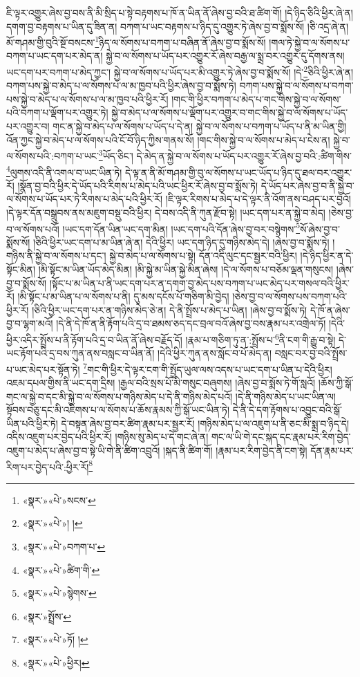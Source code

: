 ཇི་ལྟར་འགྱུར་ཞེས་བྱ་བས་ནི་མི་སྲིད་པ་སྟེ་བརྟགས་པ་ཁོ་ན་ཡིན་ནོ་ཞེས་བྱ་བའི་ཐ་ཚིག་གོ། །དེ་ཉིད་ཅིའི་ཕྱིར་ཞེ་ན། དགག་བྱ་བརྟགས་པ་ཡིན་དུ་ཟིན་ན། བཀག་པ་ཡང་བརྟགས་པ་ཉིད་དུ་འགྱུར་ཏེ་ཞེས་བྱ་བ་སྨོས་སོ། །ཅི་འདྲ་ཞེ་ན། མོ་གཤམ་གྱི་བུའི་སྔོ་བསངས་\footnote{«སྣར་»«པེ་»སངས་}ཉིད་ལ་སོགས་པ་བཀག་པ་བཞིན་ནོ་ཞེས་བྱ་བ་སྨོས་སོ། །གལ་ཏེ་སྐྱེ་བ་ལ་སོགས་པ་བཀག་པ་ཡང་དག་པར་མེད་ན། སྐྱེ་བ་ལ་སོགས་པ་ཡོད་པར་འགྱུར་རོ་ཞེས་བརྒྱ་ལ་སྨྲ་བར་འགྱུར་དུ་དོགས་ནས། ཡང་དག་པར་བཀག་པ་མེད་ཀྱང་། སྐྱེ་བ་ལ་སོགས་པ་ཡོད་པར་མི་འགྱུར་ཏེ་ཞེས་བྱ་བ་སྨོས་སོ། །དེ་\footnote{«སྣར་»«པེ་»། །}ཅིའི་ཕྱིར་ཞེ་ན། བཀག་པས་སྐྱེ་བ་མེད་པ་ལ་སོགས་པ་ལ་མ་ཁྱབ་པའི་ཕྱིར་ཞེས་བྱ་བ་སྨོས་ཏེ། བཀག་པས་སྐྱེ་བ་ལ་སོགས་པ་བཀག་པས་སྐྱེ་བ་མེད་པ་ལ་སོགས་པ་ལ་མ་ཁྱབ་པའི་ཕྱིར་རོ། །གང་གི་ཕྱིར་བཀག་པ་མེད་པ་གང་གིས་སྐྱེ་བ་ལ་སོགས་པའི་བཀག་པ་ལྡོག་པར་འགྱུར་ཏེ། སྐྱེ་བ་མེད་པ་ལ་སོགས་པ་ལྡོག་པར་འགྱུར་བ་གང་གིས་སྐྱེ་བ་ལ་སོགས་པ་ཡོད་པར་འགྱུར་བ། གང་ན་སྐྱེ་བ་མེད་པ་ལ་སོགས་པ་ཡོད་པ་དེ་ན། སྐྱེ་བ་ལ་སོགས་པ་བཀག་པ་ཡོད་པ་ནི་མ་ཡིན་གྱི། འོན་ཀྱང་སྐྱེ་བ་མེད་པ་ལ་སོགས་པའི་ངོ་བོ་ཉིད་ཀྱིས་གནས་སོ། །གང་གིས་སྐྱེ་བ་ལ་སོགས་པ་མེད་པ་ངེས་ན། སྐྱེ་བ་ལ་སོགས་པའི་:བཀག་པ་ཡང་\footnote{«སྣར་»«པེ་»བཀག་པ་}ཡོད་ཅིང་། དེ་མེད་ན་སྐྱེ་བ་ལ་སོགས་པ་ཡོད་པར་འགྱུར་རོ་ཞེས་བྱ་བའི་:ཚིག་གིས་\footnote{«སྣར་»«པེ་»ཚིག་གི་}ལུགས་འདི་ནི་འགལ་བ་ཡང་ཡིན་ཏེ། དེ་ལྟ་ན་ནི་མོ་གཤམ་གྱི་བུ་ལ་སོགས་པ་ཡང་ཡོད་པ་ཉིད་དུ་ཐལ་བར་འགྱུར་རོ། །སྣོན་བྱ་བའི་ཕྱིར་དེ་ཡོད་པའི་རིགས་པ་མེད་པའི་ཡང་ཕྱིར་རོ་ཞེས་བྱ་བ་སྨོས་ཏེ། དེ་ཡོད་པར་ཞེས་བྱ་བ་ནི་སྐྱེ་བ་ལ་སོགས་པ་ཡོད་པར་ཏེ་རིགས་པ་མེད་པའི་ཕྱིར་རོ། །ཇི་ལྟར་རིགས་པ་མེད་པ་དེ་ལྟར་ནི་འོག་ནས་བཤད་པར་བྱའོ། །དེ་ལྟར་དོན་བསྒྲུབས་ནས་མཇུག་བསྡུ་བའི་ཕྱིར། དེ་བས་འདི་ནི་ཀུན་རྫོབ་སྟེ། །ཡང་དག་པར་ན་སྐྱེ་བ་མེད། །ཅེས་བྱ་བ་ལ་སོགས་པའོ། །ཡང་དག་དོན་ཡིན་ཡང་དག་མིན། །ཡང་དག་པའི་དོན་ཞེས་བྱ་བར་བསྙེགས་\footnote{«སྣར་»«པེ་»སྙེགས་}སོ་ཞེས་བྱ་བ་སྨོས་སོ། །ཅིའི་ཕྱིར་ཡང་དག་པ་མ་ཡིན་ཞེ་ན། དེའི་ཕྱིར། ཡང་དག་ཉིད་དུ་གཉིས་མེད་དེ། །ཞེས་བྱ་བ་སྨོས་ཏེ། །གཉིས་ནི་སྐྱེ་བ་ལ་སོགས་པ་དང་། སྐྱེ་བ་མེད་པ་ལ་སོགས་པ་སྟེ། དོན་འདི་ལུང་དང་སྦྱར་བའི་ཕྱིར། །དེ་ཉིད་ཕྱིར་ན་དེ་སྟོང་མིན། །མི་སྟོང་མ་ཡིན་ཡོད་མེད་མིན། །མི་སྐྱེ་མ་ཡིན་སྐྱེ་མིན་ཞེས། །དེ་ལ་སོགས་པ་བཅོམ་ལྡན་གསུངས། །ཞེས་བྱ་བ་སྨོས་སོ། །སྟོང་པ་མ་ཡིན་པ་ནི་ཡང་དག་པར་ན་དགག་བྱ་མེད་པས་བཀག་པ་ཡང་མེད་པར་གསལ་བའི་ཕྱིར་རོ། །མི་སྟོང་པ་མ་ཡིན་པ་ལ་སོགས་པ་ནི། དུ་མས་དངོས་པོ་གཅིག་མི་བྱེད། །ཅེས་བྱ་བ་ལ་སོགས་པས་བཀག་པའི་ཕྱིར་རོ། །ཅིའི་ཕྱིར་ཡང་དག་པར་ན་གཉིས་མེད་ཅེ་ན། དེ་ནི་སྤྲོས་པ་མེད་པ་ཡིན། །ཞེས་བྱ་བ་སྨོས་ཏེ། དེ་ཁོ་ན་ཞེས་བྱ་བ་ལྷག་མའོ། །དེ་ནི་དེ་ཁོ་ན་ནི་རྟོག་པའི་དྲ་བ་ཐམས་ཅད་དང་བྲལ་བའོ་ཞེས་བྱ་བས་རྣམ་པར་འགྲེལ་ཏོ། །དེའི་ཕྱིར་འདིར་སྤྲོས་པ་ནི་རྟོག་པའི་དྲ་བ་ཡིན་ནོ་ཞེས་བརྗོད་དོ། །རྣམ་པ་གཅིག་ཏུ་ན་:སྤྲོས་པ་\footnote{«སྣར་»སྤྲོས་}ནི་ངག་གི་རྒྱུ་བ་སྟེ། དེ་ཡང་རྟོག་པའི་དྲ་བས་ཀུན་ནས་བསླང་བ་ཡིན་ནོ། །དེའི་ཕྱིར་ཀུན་ནས་སློང་བ་པོ་མེད་ན། བསླང་བར་བྱ་བའི་སྤྲོས་པ་ཡང་མེད་པར་སྟོན་ཏེ། \footnote{«སྣར་»«པེ་»ཏོ། ། }གང་གི་ཕྱིར་དེ་ལྟར་ངག་གི་སྤྱོད་ཡུལ་ལས་འདས་པ་ཡང་དག་པ་ཡིན་པ་དེའི་ཕྱིར། འཇམ་དཔལ་གྱིས་ནི་ཡང་དག་དྲིས། །རྒྱལ་བའི་སྲས་པོ་མི་གསུང་བཞུགས། །ཞེས་བྱ་བ་སྨོས་ཏེ་གོ་སླའོ། །ཆོས་ཀྱི་སྒོ་གང་ལ་སྐྱེ་བ་དང་མི་སྐྱེ་བ་ལ་སོགས་པ་གཉིས་མེད་པ་དེ་ནི་གཉིས་མེད་པའོ། །དེ་ནི་གཉིས་མེད་པ་ཡང་ཡིན་ལ། སྟོབས་བཅུ་དང་མི་འཇིགས་པ་ལ་སོགས་པ་ཆོས་རྣམས་ཀྱི་སྒོ་ཡང་ཡིན་ཏེ། དེ་ནི་དེ་དག་རྟོགས་པ་འབྱུང་བའི་སྒོ་ཡིན་པའི་ཕྱིར་ཏེ། དེ་བསྟན་ཞེས་བྱ་བར་ཚིག་རྣམ་པར་སྦྱར་རོ། །གཉིས་མེད་པ་ལ་འཇུག་པ་ནི་ཅང་མི་སྨྲ་བ་ཉིད་དེ། འདིས་འཇུག་པར་བྱེད་པའི་ཕྱིར་རོ། །གཉིས་སུ་མེད་པ་དེ་གང་ཞེ་ན། གང་ལ་ཡི་གེ་དང་སྐད་དང་རྣམ་པར་རིག་བྱེད་འཇུག་པ་མེད་པ་ཞེས་བྱ་བ་སྟེ་ཡི་གེ་ནི་ཚིག་འབྲུའོ། །སྐད་ནི་ཚིག་གོ། །རྣམ་པར་རིག་བྱེད་ནི་ངག་སྟེ། དོན་རྣམ་པར་རིག་པར་བྱེད་པའི་:ཕྱིར་རོ།\footnote{«སྣར་»«པེ་»ཕྱིར།} 
